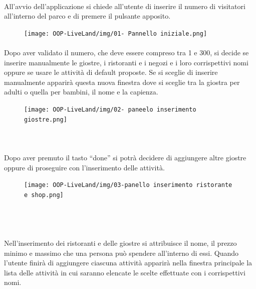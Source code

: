 \documentclass[a4paper,12pt]{report}
\begin{document}
\paragraph{}All’avvio dell'applicazione si chiede all’utente di inserire il numero di visitatori all’interno del parco e di premere il pulsante apposito.

\begin{figure}[h]
\centering{}
\texttt{[image: OOP-LiveLand/img/01- Pannello iniziale.png]}
\label{img:menu}
\end{figure}

\paragraph{}Dopo aver validato il numero, che deve essere compreso tra 1 e 300, si decide se inserire manualmente le giostre, i ristoranti e i negozi e i loro corrispettivi nomi oppure se usare le attività di default proposte.
Se si sceglie di inserire manualmente apparirà questa nuova finestra dove si sceglie tra la giostra per adulti o quella per bambini, il nome e la capienza.

\begin{figure}[h]
\centering{}
\texttt{[image: OOP-LiveLand/img/02- paneelo inserimento giostre.png]}
\label{img:fair}
\end{figure}

\paragraph{\\}Dopo aver premuto il tasto “done” si potrà decidere di aggiungere altre giostre oppure di proseguire con l’inserimento delle attività. 

\begin{figure}[h]
\centering{}
\texttt{[image: OOP-LiveLand/img/03-panello inserimento ristorante e shop.png]}
\label{img:profit}
\end{figure}

\paragraph{\\\\}Nell’inserimento dei ristoranti e delle giostre si attribuisce il nome, il prezzo minimo e massimo che una persona può spendere all’interno di essi.
Quando l’utente finirà di aggiungere ciascuna attività apparirà nella finestra principale la lista delle attività in cui saranno elencate le scelte effettuate con i corrispettivi nomi.
\end{document}

